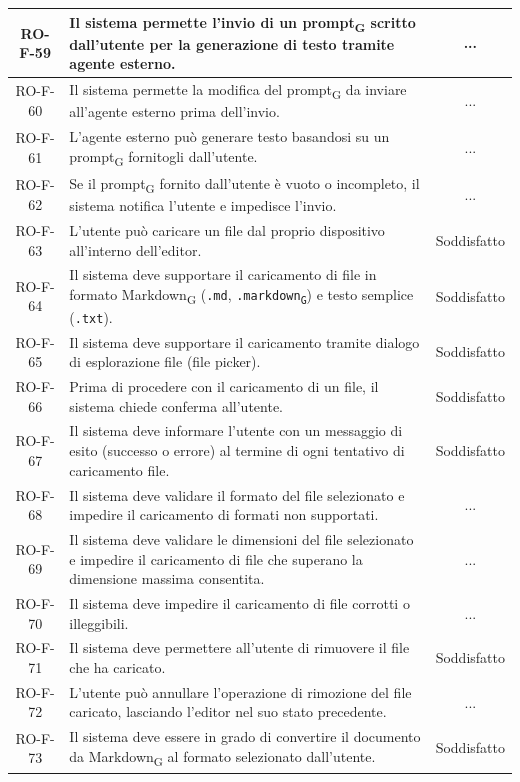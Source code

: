 \documentclass[11pt,a4paper]{article}
\newcommand{\gls}[1]{#1\textsubscript{G}}
\begin{document}
\begin{longtable}{|c|p{11cm}|c|}
\hline
RO-F-59 & Il sistema permette l'invio di un \gls{prompt} scritto dall'utente per la generazione di testo tramite agente esterno. & ... \\
\hline
RO-F-60 & Il sistema permette la modifica del \gls{prompt} da inviare all'agente esterno prima dell'invio. & ... \\
\hline
RO-F-61 & L'agente esterno può generare testo basandosi su un \gls{prompt} fornitogli dall'utente. & ... \\
\hline
RO-F-62 & Se il \gls{prompt} fornito dall'utente è vuoto o incompleto, il sistema notifica l'utente e impedisce l'invio. & ... \\
\hline
RO-F-63 & L'utente può caricare un file dal proprio dispositivo all'interno dell'editor. & Soddisfatto \\
\hline
RO-F-64 & Il sistema deve supportare il caricamento di file in formato \gls{Markdown} (\texttt{.md}, \texttt{.\gls{markdown}}) e testo semplice (\texttt{.txt}). & Soddisfatto \\
\hline
RO-F-65 & Il sistema deve supportare il caricamento tramite dialogo di esplorazione file (file picker). & Soddisfatto \\
\hline
RO-F-66 & Prima di procedere con il caricamento di un file, il sistema chiede conferma all'utente. & Soddisfatto \\
\hline
RO-F-67 & Il sistema deve informare l'utente con un messaggio di esito (successo o errore) al termine di ogni tentativo di caricamento file. & Soddisfatto \\
\hline
RO-F-68 & Il sistema deve validare il formato del file selezionato e impedire il caricamento di formati non supportati. & ... \\
\hline
RO-F-69 & Il sistema deve validare le dimensioni del file selezionato e impedire il caricamento di file che superano la dimensione massima consentita. & ... \\
\hline
RO-F-70 & Il sistema deve impedire il caricamento di file corrotti o illeggibili. & ... \\
\hline
RO-F-71 & Il sistema deve permettere all'utente di rimuovere il file che ha caricato. & Soddisfatto \\
\hline
RO-F-72 & L'utente può annullare l'operazione di rimozione del file caricato, lasciando l'editor nel suo stato precedente. & ... \\
\hline
RO-F-73 & Il sistema deve essere in grado di convertire il documento da \gls{Markdown} al formato selezionato dall'utente. & Soddisfatto \\

\end{longtable}
\end{document}
